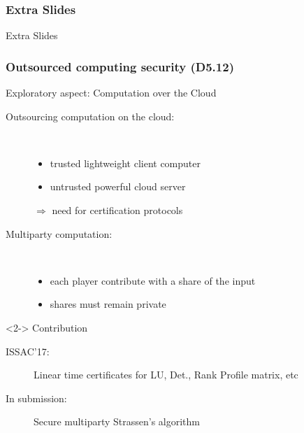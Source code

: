 \documentclass{beamer}
\begin{document}
\begin{frame}
  \frametitle{Extra Slides}

  \begin{center}
    \Large Extra Slides
  \end{center}
\end{frame}
\begin{frame}
  \frametitle{Outsourced computing security (D5.12)}

  \begin{block}{Exploratory aspect: Computation over the Cloud}
    \begin{description}
    \item[Outsourcing computation on the cloud:]\ 
      \begin{itemize}
      \item trusted lightweight client computer
      \item untrusted powerful cloud server
      \end{itemize}
      $\Rightarrow$ need for certification protocols
    \item[Multiparty computation:] \
      \begin{itemize}
      \item each player contribute with a share of the input
      \item shares must remain private
      \end{itemize}
    \end{description}
\end{block}
  \begin{block}<2->
      {Contribution}
      \begin{description}
        \item[ISSAC'17:] Linear time certificates for LU, Det., Rank Profile  matrix, etc
        \item[In submission:] Secure multiparty Strassen's algorithm
      \end{description}
  \end{block}

\end{frame}
\end{document}
